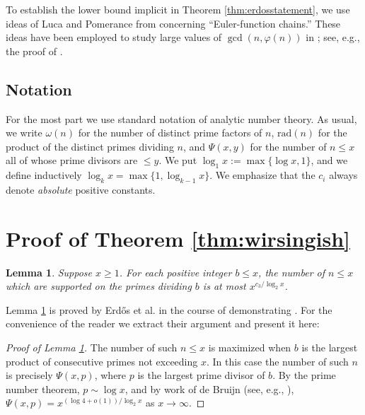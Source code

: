 \documentclass[12pt]{amsart}
\newtheorem{lem}{Lemma}
\theoremstyle{definition}
\theoremstyle{remark}
\renewcommand\phi\varphi
\newcommand{\rad}{\mathrm{rad}}
\begin{document}
To establish the lower  bound implicit in Theorem \ref{thm:erdosstatement}, we use ideas of Luca and Pomerance from \cite{LP07} concerning ``Euler-function chains.'' These ideas have been employed to study large values of $\gcd(n,\phi(n))$ in \cite{ELP08}; see, e.g., the proof of \cite[Theorem 7]{ELP08}.

\subsection*{Notation} For the most part we use standard notation of analytic number theory. As usual, we write $\omega(n)$ for the number of distinct prime factors of $n$, $\rad(n)$ for the product of the distinct primes dividing $n$, and $\Psi(x,y)$ for the number of $n \leq x$ all of whose prime divisors are $\leq y$. We put $\log_1{x}:=\max\{\log{x}, 1\}$, and we define inductively $\log_k{x} = \max\{1, \log_{k-1}{x}\}$. We emphasize that the $c_i$ always denote \emph{absolute} positive constants.

\section{Proof of Theorem \ref{thm:wirsingish}}
\begin{lem}\label{lem:support} Suppose $x \geq 1$. For each positive integer $b\leq x$, the number of $n \leq x$ which are supported on the primes dividing $b$ is at most $x^{c_3/\log_2{x}}$.
\end{lem}

Lemma \ref{lem:support} is proved by Erd\H{o}s et al. in the course of demonstrating \cite[Theorem 11]{ELP08}. For the convenience of the reader we extract their argument and present it here:

\begin{proof}[Proof of Lemma \ref{lem:support}] The number of such $n \leq x$ is maximized when $b$ is the largest product of consecutive primes not exceeding $x$. In this case the number of such $n$ is precisely $\Psi(x,p)$, where $p$ is the largest prime divisor of $b$. By the prime number theorem, $p \sim \log x$, and by work of de Bruijn (see, e.g., \cite[Theorem 2, p. 359]{tenenbaum95}), $\Psi(x,p) = x^{(\log{4} + o(1))/\log_2{x}}$ as $x\to\infty$.
\end{proof}
\end{document}
